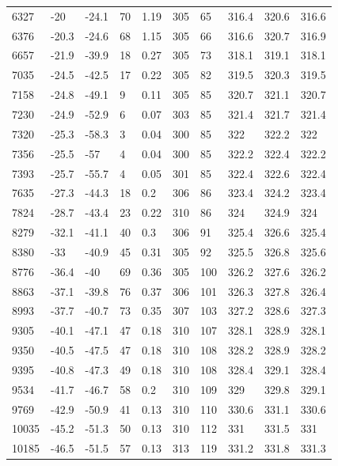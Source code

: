 \documentclass{article}
\begin{document}
{\begin{longtable}[h!]{p{}|p{}|p{}|p{}|p{}|p{}|p{}|p{}|p{}|p{}}
    6327 & -20 & -24.1 & 70 & 1.19 & 305 & 65 & 316.4 & 320.6 & 316.6 \\
    6376 & -20.3 & -24.6 & 68 & 1.15 & 305 & 66 & 316.6 & 320.7 & 316.9 \\
    6657 & -21.9 & -39.9 & 18 & 0.27 & 305 & 73 & 318.1 & 319.1 & 318.1 \\
    7035 & -24.5 & -42.5 & 17 & 0.22 & 305 & 82 & 319.5 & 320.3 & 319.5 \\
    7158 & -24.8 & -49.1 & 9 & 0.11 & 305 & 85 & 320.7 & 321.1 & 320.7 \\
    7230 & -24.9 & -52.9 & 6 & 0.07 & 303 & 85 & 321.4 & 321.7 & 321.4 \\
    7320 & -25.3 & -58.3 & 3 & 0.04 & 300 & 85 & 322 & 322.2 & 322 \\
    7356 & -25.5 & -57 & 4 & 0.04 & 300 & 85 & 322.2 & 322.4 & 322.2 \\
    7393 & -25.7 & -55.7 & 4 & 0.05 & 301 & 85 & 322.4 & 322.6 & 322.4 \\
    7635 & -27.3 & -44.3 & 18 & 0.2 & 306 & 86 & 323.4 & 324.2 & 323.4 \\
    7824 & -28.7 & -43.4 & 23 & 0.22 & 310 & 86 & 324 & 324.9 & 324 \\
    8279 & -32.1 & -41.1 & 40 & 0.3 & 306 & 91 & 325.4 & 326.6 & 325.4 \\
    8380 & -33 & -40.9 & 45 & 0.31 & 305 & 92 & 325.5 & 326.8 & 325.6 \\
    8776 & -36.4 & -40 & 69 & 0.36 & 305 & 100 & 326.2 & 327.6 & 326.2 \\
    8863 & -37.1 & -39.8 & 76 & 0.37 & 306 & 101 & 326.3 & 327.8 & 326.4 \\
    8993 & -37.7 & -40.7 & 73 & 0.35 & 307 & 103 & 327.2 & 328.6 & 327.3 \\
    9305 & -40.1 & -47.1 & 47 & 0.18 & 310 & 107 & 328.1 & 328.9 & 328.1 \\
    9350 & -40.5 & -47.5 & 47 & 0.18 & 310 & 108 & 328.2 & 328.9 & 328.2 \\
    9395 & -40.8 & -47.3 & 49 & 0.18 & 310 & 108 & 328.4 & 329.1 & 328.4 \\
    9534 & -41.7 & -46.7 & 58 & 0.2 & 310 & 109 & 329 & 329.8 & 329.1 \\
    9769 & -42.9 & -50.9 & 41 & 0.13 & 310 & 110 & 330.6 & 331.1 & 330.6 \\
    10035 & -45.2 & -51.3 & 50 & 0.13 & 310 & 112 & 331 & 331.5 & 331 \\
    10185 & -46.5 & -51.5 & 57 & 0.13 & 313 & 119 & 331.2 & 331.8 & 331.3 \\

\end{longtable}}
\end{document}
